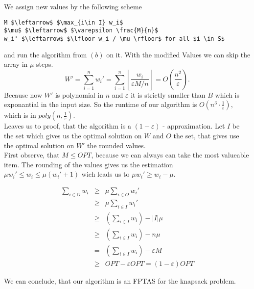 \pagebreak

We assign new values by the following scheme

\begin{lstlisting}
M $\leftarrow$ $\max_{i\in I} w_i$
$\mu$ $\leftarrow$ $\varepsilon \frac{M}{n}$
w_i' $\leftarrow$ $\lfloor w_i / \mu \rfloor$ for all $i \in S$
\end{lstlisting}

and run the algorithm from $(b)$ on it.
With the modified Values we can skip the array in $\mu$ steps.
$$
    W' = \underset{i=1}{\overset{n}{\sum}} w_i' = \underset{i=1}{\overset{n}{\sum}} \left\lfloor \frac{w_i}{\varepsilon M/n} \right\rfloor = O(\frac{n^2}{\varepsilon}).
$$
Because now $W'$ is polynomial in $n$ and $\varepsilon$ it is strictly smaller than $B$ which is exponantial in the input size. So the runtime of our algorithm
is $O(n^3 \cdot \frac{1}{\varepsilon})$, which is in $poly(n,\frac{1}{\varepsilon})$.\\

Leaves us to proof, that the algorithm is a $(1-\varepsilon)$ - approximation.
Let $I$ be the set which gives us the optimal solution on $W$ and $O$ the set, that gives use the optimal solution on $W'$ the rounded values.\\

First observe, that $M \leq OPT$, because we can always can take the most valueable item. The rounding of the values gives us the estimation 
$ \mu w_i' \leq w_i \leq \mu (w_i' + 1)$ wich leads us to $\mu w_i'  \geq w_i - \mu$.

$$\begin{array}{rcl}
    \underset{i \in O}{\sum} w_i &\geq& \mu \underset{i \in O}{\sum} w_i'\\
        &\geq& \mu \underset{i \in I}{\sum} w_i'\\
        &\geq& (\underset{i \in I}{\sum} w_i) - |I|\mu\\
        &\geq& (\underset{i \in I}{\sum} w_i) - n \mu\\
        &=& (\underset{i \in I}{\sum} w_i) - \varepsilon M\\
        &\geq& OPT - \varepsilon OPT = (1-\varepsilon) OPT
\end{array}$$ 

We can conclude, that our algorithm is an FPTAS for the knapsack problem.
